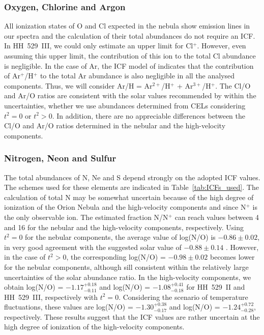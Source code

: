 \documentclass[fleqn,usenatbib]{mnras}
\begin{document}
\subsubsection{Oxygen, Chlorine and Argon}
\label{subsec:O_Cl_Ar_CELs}

All ionization states of O and Cl expected in the nebula show emission lines in our spectra and the calculation of their total abundances do not require an ICF. In HH~529~III, we could only estimate an upper limit for Cl$^+$. However, even assuming this upper limit, the contribution of this ion to the total Cl abundance is negligible. In the case of Ar, the ICF model of \citet{izotov06} indicates that the contribution of Ar$^+$/H$^+$ to the total Ar abundance is also negligible in all the analysed components. Thus, we will consider  Ar/H = Ar$^{2+}$/H$^{+}$ + Ar$^{3+}$/H$^{+}$. The Cl/O and Ar/O ratios are consistent with the solar values recommended by \citet{lodders19} within the uncertainties, whether we use abundances determined from CELs considering $t^2=0$ or $t^2>0$. In addition, there are no appreciable differences between the Cl/O and Ar/O ratios determined in the nebular and the high-velocity components.

\subsubsection{Nitrogen, Neon and Sulfur}
\label{subsec:N_Ne_S_CELs}

The total abundances of N, Ne and S  depend  strongly on the adopted ICF values. The schemes used for these elements are indicated in Table~\ref{tab:ICFs_used}. The calculation of total N may be somewhat uncertain because of the high degree of ionization of the Orion Nebula and the high-velocity components and since N$^+$ is the only observable ion. The estimated fraction N/N$^{+}$ can reach values between 4 and 16 for the nebular and the high-velocity components, respectively. Using $t^2=0$ for the nebular components, the average value of log(N/O) is $-0.86 \pm 0.02$, in very good agreement with the suggested solar value of $-0.88\pm 0.14$ \citep{lodders19}. However, in the case of $t^2>0$, the corresponding log(N/O) = $-0.98 \pm 0.02$ becomes lower for the nebular components, although sill consistent within the relatively large uncertainties of the solar abundance ratio. In the high-velocity components, we obtain log(N/O) = $-1.17 ^{+0.18} _{-0.11}$ and log(N/O) = $-1.08 ^{+0.41} _{-0.18}$ for HH~529~II and HH~529~III, respectively with $t^2=0$. Considering the scenario of temperature fluctuations, these values are log(N/O) = $-1.30 ^{+0.38} _{-0.17}$ and log(N/O) = $-1.24 ^{+0.72} _{-0.28}$, respectively. These results  suggest that the ICF values are rather uncertain at the high degree of ionization of the high-velocity components.
\end{document}
